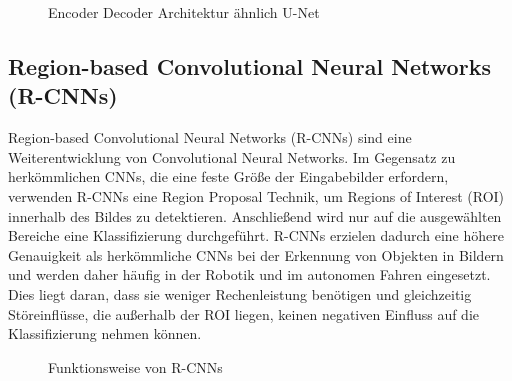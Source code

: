 \begin{figure}
    \centering
    
    \caption{Encoder Decoder Architektur ähnlich U-Net}
    \label{fig:FCN}
\end{figure}

\subsection{Region-based Convolutional Neural Networks (R-CNNs)}
Region-based Convolutional Neural Networks (R-CNNs) sind eine Weiterentwicklung
von Convolutional Neural Networks. Im Gegensatz zu herkömmlichen CNNs, die eine
feste Größe der Eingabebilder erfordern, verwenden R-CNNs eine Region Proposal
Technik, um Regions of Interest (ROI) innerhalb des Bildes zu detektieren.
Anschließend wird nur auf die ausgewählten Bereiche eine Klassifizierung
durchgeführt. R-CNNs erzielen dadurch eine höhere Genauigkeit als herkömmliche
CNNs bei der Erkennung von Objekten in Bildern und werden daher häufig in der
Robotik und im autonomen Fahren eingesetzt. Dies liegt daran, dass sie weniger
Rechenleistung benötigen und gleichzeitig Störeinflüsse, die außerhalb der ROI
liegen, keinen negativen Einfluss auf die Klassifizierung nehmen können.
\cite{Girshick_2015_ICCV}

\begin{figure}
    \centering
    
    \caption{Funktionsweise von R-CNNs}
    \label{fig:CNN}
\end{figure}